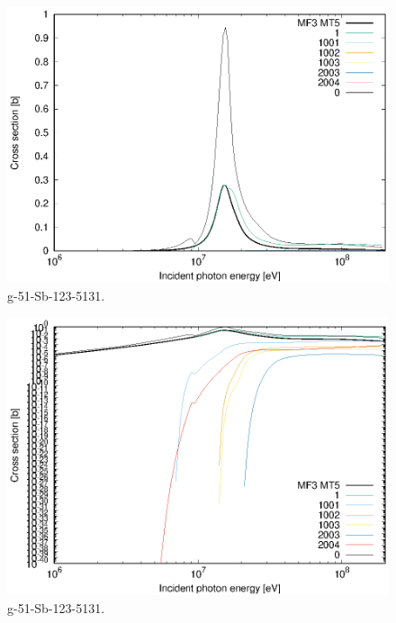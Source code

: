 \begin{figure}
 \includegraphics[width=\linewidth]{eps/g_51-Sb-123_5131.eps}
  \caption{g-51-Sb-123-5131.}
\end{figure}
\begin{figure}
 \includegraphics[width=\linewidth]{eps-log/g_51-Sb-123_5131.eps}
 \caption{g-51-Sb-123-5131.}
\end{figure}
\newpage \clearpage

